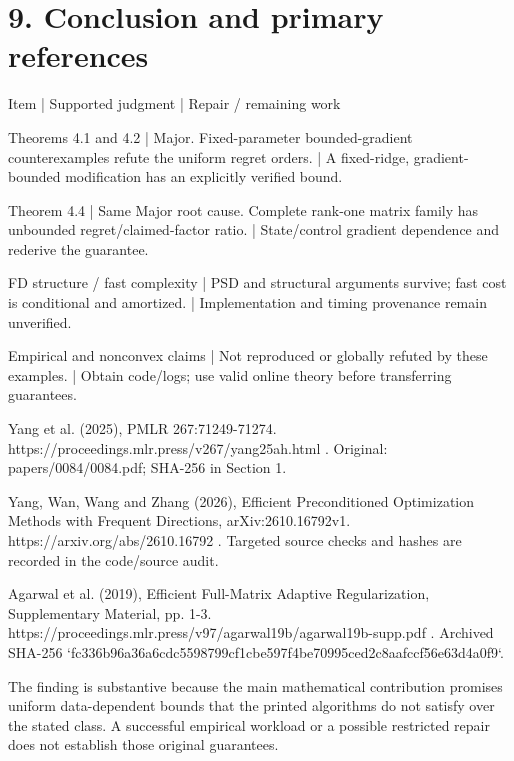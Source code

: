 \documentclass[10pt]{article}
\begin{document}
\section*{9. Conclusion and primary references}
Item | Supported judgment | Repair / remaining work\par
Theorems 4.1 and 4.2 | Major. Fixed-parameter bounded-gradient counterexamples refute the uniform regret orders. | A fixed-ridge, gradient-bounded modification has an explicitly verified bound.\par
Theorem 4.4 | Same Major root cause. Complete rank-one matrix family has unbounded regret/claimed-factor ratio. | State/control gradient dependence and rederive the guarantee.\par
FD structure / fast complexity | PSD and structural arguments survive; fast cost is conditional and amortized. | Implementation and timing provenance remain unverified.\par
Empirical and nonconvex claims | Not reproduced or globally refuted by these examples. | Obtain code/logs; use valid online theory before transferring guarantees.\par
[P1] Yang et al. (2025), PMLR 267:71249-71274. https://proceedings.mlr.press/v267/yang25ah.html . Original: papers/0084/0084.pdf; SHA-256 in Section 1.\par
[P2] Yang, Wan, Wang and Zhang (2026), Efficient Preconditioned Optimization Methods with Frequent Directions, arXiv:2610.16792v1. https://arxiv.org/abs/2610.16792 . Targeted source checks and hashes are recorded in the code/source audit.\par
[P3] Agarwal et al. (2019), Efficient Full-Matrix Adaptive Regularization, Supplementary Material, pp. 1-3. https://proceedings.mlr.press/v97/agarwal19b/agarwal19b-supp.pdf . Archived SHA-256 `fc336b96a36a6cdc5598799cf1cbe597f4be70995ced2c8aafccf56e63d4a0f9`.\par
The finding is substantive because the main mathematical contribution promises uniform data-dependent bounds that the printed algorithms do not satisfy over the stated class. A successful empirical workload or a possible restricted repair does not establish those original guarantees.\par
\end{document}
